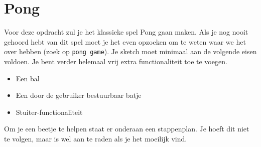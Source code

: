 \documentclass{../qh_assignment}
\begin{document}
\section{Pong}
Voor deze opdracht zul je het klassieke spel Pong gaan maken. Als je nog nooit gehoord hebt van dit spel moet je het even opzoeken om te weten waar we het over hebben (zoek op \texttt{pong game}). Je sketch moet minimaal aan de volgende eisen voldoen. Je bent verder helemaal vrij extra functionaliteit toe te voegen. 
\begin{itemize}
    \item Een bal
    \item Een door de gebruiker bestuurbaar batje
    \item Stuiter-functionaliteit
\end{itemize}
Om je een beetje te helpen staat er onderaan een stappenplan. Je hoeft dit niet te volgen, maar is wel aan te raden als je het moeilijk vind.
    
\end{document}
